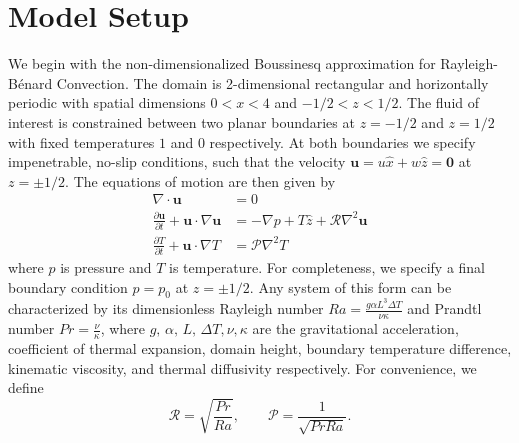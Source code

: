 \documentclass[reprint,amsmath,amssymb,aps]{revtex4-1}
\begin{document}
\section{Model Setup}\label{sec:model}
We begin with the non-dimensionalized Boussinesq approximation for Rayleigh-Bénard Convection. 
The domain is 2-dimensional rectangular and horizontally periodic with spatial dimensions $0 < x < 4$ and $-1/2 < z < 1/2$. 
The fluid of interest is constrained between two planar boundaries at $z = -1/2$ and $z = 1/2$ with fixed temperatures $1$ and $0$ respectively. 
At both boundaries we specify impenetrable, no-slip conditions, such that the velocity $\mathbf{u} = u \hat{x} + w \hat{z} = \mathbf{0}$ at $z = \pm 1/2$. 
The equations of motion are then given by
\begin{align}
    \nabla \cdot \mathbf{u} &= 0 \label{EQ:motion1}\\
    \frac{\partial \mathbf{u}}{\partial t} + \mathbf{u} \cdot \nabla \mathbf{u} &= - \nabla p + T \hat{z} + \mathcal{R} \nabla^2 \mathbf{u} \label{EQ:motion2}\\
    \frac{\partial T}{\partial t} + \mathbf{u} \cdot \nabla T &= \mathcal{P} \nabla^2 T \label{EQ:motion3}
\end{align}
where $p$ is pressure and $T$ is temperature. 
For completeness, we specify a final boundary condition $p = p_0$ at $z = \pm 1/2$. 
Any system of this form can be characterized by its dimensionless Rayleigh number $Ra = \frac{g\alpha L^3 \Delta T}{\nu \kappa}$ and Prandtl number $Pr = \frac{\nu}{\kappa}$, where $g, \, \alpha, \, L, \, \Delta T, \nu, \kappa$ are the gravitational acceleration, coefficient of thermal expansion, domain height, boundary temperature difference, kinematic viscosity, and thermal diffusivity respectively. For convenience, we define
\begin{equation}
\mathcal{R} = \sqrt{\frac{Pr}{Ra}}, \qquad \mathcal{P} = \frac{1}{\sqrt{Pr Ra}}.
\end{equation}
\end{document}
